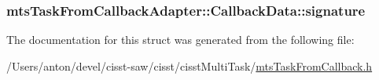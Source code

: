 \subsubsection[{signature}]{ mts\+Task\+From\+Callback\+Adapter\+::\+Callback\+Data\+::signature}\label{structmts_task_from_callback_adapter_1_1_callback_data_a657f9a6d041e0ba81dfb27a8610d6650}


The documentation for this struct was generated from the following file\+:\begin{DoxyCompactItemize}
\item 
/\+Users/anton/devel/cisst-\/saw/cisst/cisst\+Multi\+Task/\hyperlink{mts_task_from_callback_8h}{mts\+Task\+From\+Callback.\+h}\end{DoxyCompactItemize}
